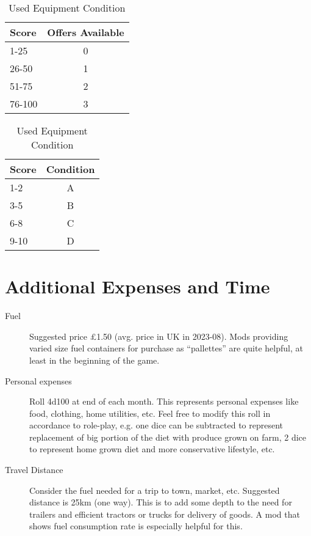 \documentclass[a4paper,10pt]{article}
\begin{document}
\begin{table}
\begin{minipage}{0.5\textwidth}
\begin{center}
  \caption{Used Equipment Availability}
  \begin{tabular}{lc}
    \toprule
    Score  & Offers Available\\
    \midrule
    1-25   & 0\\
    26-50  & 1\\
    51-75  & 2\\
    76-100 & 3\\
    \bottomrule
  \end{tabular}
  \label{tab:usedEquipmentOffers}
\end{center}
\end{minipage}%
%
\begin{minipage}{0.5\textwidth}
\begin{center}
  \caption{Used Equipment Condition}
  \begin{tabular}{lc}
    \toprule
    Score  & Condition\\
    \midrule
    1-2    & A\\
    3-5    & B\\
    6-8    & C\\
    9-10   & D\\
    \bottomrule
  \end{tabular}
  \label{tab:usedEquipmentOfferRatings}
\end{center}
\end{minipage}
\end{table}


\section{Additional Expenses and Time}
\begin{description}
\item[Fuel] Suggested price \pounds{}1.50 (avg. price in UK in 2023-08). Mods
  providing varied size fuel containers for purchase as ``pallettes'' are quite
  helpful, at least in the beginning of the game.
\item[Personal expenses] Roll 4d100 at end of each month. This represents
  personal expenses like food, clothing, home utilities, etc. Feel free to
  modify this roll in accordance to role-play, e.g. one dice can be subtracted
  to represent replacement of big portion of the diet with produce grown on
  farm, 2 dice to represent home grown diet and more conservative lifestyle,
  etc.
\item[Travel Distance] Consider the fuel needed for a trip to town, market, etc.
  Suggested distance is 25km (one way). This is to add some depth to the need
  for trailers and efficient tractors or trucks for delivery of goods. A mod
  that shows fuel consumption rate is especially helpful for this.
\end{description}
\end{document}
